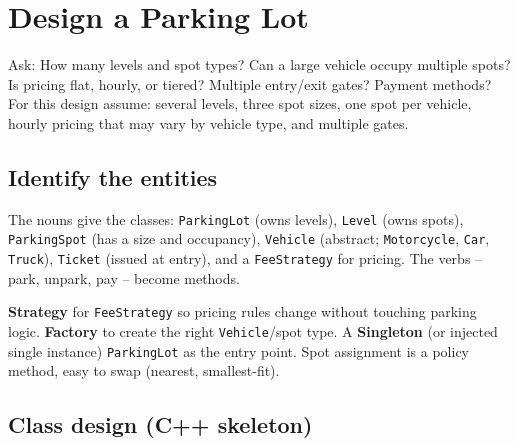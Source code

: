 \section{Design a Parking Lot}
\label{sec:case-parking-lot}


\begin{patternbox}
Ask: How many levels and spot types? Can a large vehicle occupy multiple
spots? Is pricing flat, hourly, or tiered? Multiple entry/exit gates?
Payment methods? For this design assume: several levels, three spot sizes,
one spot per vehicle, hourly pricing that may vary by vehicle type, and
multiple gates.
\end{patternbox}

\subsection*{Identify the entities}

The nouns give the classes: \texttt{ParkingLot} (owns levels),
\texttt{Level} (owns spots), \texttt{ParkingSpot} (has a size and
occupancy), \texttt{Vehicle} (abstract; \texttt{Motorcycle},
\texttt{Car}, \texttt{Truck}), \texttt{Ticket} (issued at entry),
and a \texttt{FeeStrategy} for pricing. The verbs -- park, unpark, pay --
become methods.

\begin{ideabox}
\textbf{Strategy} for \texttt{FeeStrategy} so pricing rules change without
touching parking logic. \textbf{Factory} to create the right
\texttt{Vehicle}/spot type. A \textbf{Singleton} (or injected single
instance) \texttt{ParkingLot} as the entry point. Spot assignment is a
policy method, easy to swap (nearest, smallest-fit).
\end{ideabox}

\subsection*{Class design (C++ skeleton)}

